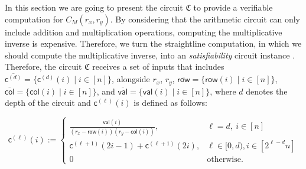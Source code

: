 In this section we are going to present the circuit $\mathfrak{C}$ to provide a verifiable computation for $C_M(r_x, r_y)$.  By considering that the arithmetic circuit can only include addition and multiplication operations, computing the multiplicative inverse is expensive. Therefore, we turn the straightline computation, in which we should compute the multiplicative inverse, into an \textit{satisfiability} circuit instance \cite{Thaler2022Proofs}. Therefore, the circuit $\mathfrak{C}$ receives a set of inputs that includes $\overline{\mathsf{c}^{(d)}} = \{\mathsf{c}^{(d)}(i) \mid i \in [n]\}$, alongside $r_x$, $r_y$, $\overline{\mathsf{row}} = \{\mathsf{row}(i) \mid i \in [n]\}$, $\overline{\mathsf{col}} = \{\mathsf{col}(i) \mid i \in [n]\}$, and $\overline{\mathsf{val}} = \{\mathsf{val}(i) \mid i \in [n]\}$, where $d$ denotes the depth of the circuit and $\mathsf{c}^{(\ell)}(i)$ is defined as follows:

\begin{equation}
	\mathsf{c}^{(\ell)}(i) := 
	\begin{cases}
		\frac{\mathsf{val}(i)}{\left(r_x - \mathsf{row}(i)\right)\left(r_y - \mathsf{col}(i)\right)}, & \ell = d,  \  i \in [n]\\%
		\mathsf{c}^{(\ell + 1)}(2i-1) + \mathsf{c}^{(\ell + 1)}(2i), & \ell \in [ 0,  d), i \in  [2^{\ell-d}n]  \\
		0 & \text{otherwise}.
	\end{cases}
	\label{eq:c_i}
\end{equation}

